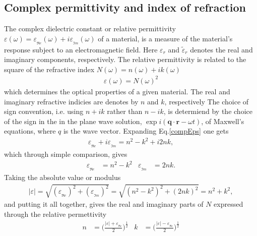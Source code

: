 \subsection{Complex permittivity and index of refraction}
The complex dielectric constant or relative permittivity 
$\varepsilon(\omega) = \varepsilon\!_{_{\Re\! e}} \!\!(\omega) + i \varepsilon\!_{_{\Im\! m}} \!\!(\omega)$ of a material, is a measure of 
the material's response subject to an electromagnetic field. Here $\varepsilon_r$ and $\tilde\varepsilon_r$ 
denotes the real and imaginary components, respectively.
The relative permittivity is related to
the square of the refractive index $N(\omega) = n(\omega)  + i k(\omega) $ 
\begin{align}
   \varepsilon (\omega) = N(\omega)^2
   \label{compEps}
\end{align}
which determines the optical properties of a given material.
The real and imaginary refractive indicies are denotes by $n$ and $k$, respectively
The choice of sign convention, i.e. using $n+ik$ rather than $n-ik$, is determiend by 
the choice of the sign in the in the plane wave solution,
$\exp i(\boldsymbol q \cdot \boldsymbol r - \omega t )$, of
Maxwell's equations, where $q$ is the wave vector.
%
Expanding Eq.\eqref{compEps} one gets
\begin{align}
   \varepsilon\!_{_{\Re\! e}} + i \varepsilon\!_{_{\Im\! m}} = n^2 - k^2 + i2nk,
\end{align}
which through simple comparison, gives
\begin{align}
   \varepsilon\!_{_{\Re\! e}} &= n^2 - k^2     &\varepsilon\!_{_{\Im\! m}}  &= 2nk.
\end{align}
Taking the absolute value or modulus
\begin{align}
   |\varepsilon|   = \sqrt{ (\varepsilon\!_{_{\Re\! e}})^2 + (\varepsilon\!_{_{\Im\! m}})^2 } 
   = \sqrt{ (n^2 - k^2)^2 + (2nk)^2} 
   = n^2 + k^2,
\end{align}
and putting it all together, gives the real and imaginary parts of $N$ expressed through the 
relative permettivity
\begin{align}
   n      &= \Bigg( \frac{|\varepsilon| + \varepsilon\!_{_{\Re\! e}}}{2} \Bigg)^{\frac{1}{2}} 
  &k &=      \Bigg( \frac{|\varepsilon| - \varepsilon\!_{_{\Re\! e}}}{2} \Bigg)^{\frac{1}{2}} 
\end{align}
